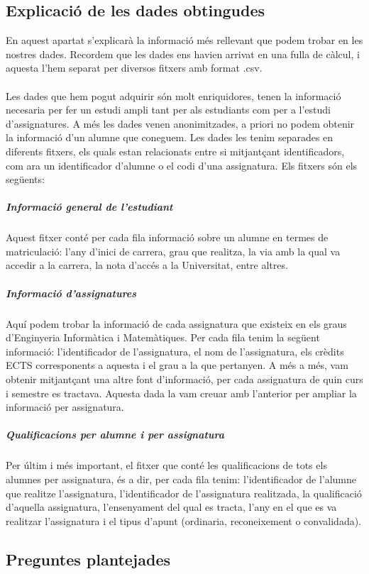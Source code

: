 \documentclass[12pt,a4paper,catalan]{article}
\begin{document}
\subsection{Explicació de les dades obtingudes} 
En aquest apartat s'explicarà la informació més rellevant que podem trobar en les nostres dades. Recordem que les dades ens havien arrivat en una fulla de càlcul, i aquesta l'hem separat per diversos fitxers amb format .csv.
\\
\\
Les dades que hem pogut adquirir són molt enriquidores, tenen la informació necesaria per fer un estudi ampli tant per als estudiants com per a l'estudi d'assignatures. A més les dades venen anonimitzades, a priori no podem obtenir la informació d'un alumne que coneguem. Les dades les tenim separades en diferents fitxers, els quals estan relacionats entre si mitjantçant identificadors, com ara un identificador d'alumne o el codi d'una assignatura. Els fitxers són els següents:

\subparagraph{Informació general de l'estudiant}
Aquest fitxer conté per cada fila informació sobre un alumne en termes de matriculació: l'any d'inici de carrera, grau que realitza, la via amb la qual va accedir a la carrera, la nota d'accés a la Universitat, entre altres.

\subparagraph{Informació d'assignatures}
Aquí podem trobar la informació de cada assignatura que existeix en els graus d'Enginyeria Informàtica i Matemàtiques. Per cada fila tenim la següent informació: l'identificador de l'assignatura, el nom de l'assignatura, els crèdits ECTS corresponents a aquesta i el grau a la que pertanyen. A més a més, vam obtenir mitjantçant una altre font d'informació, per cada assignatura de quin curs i semestre es tractava. Aquesta dada la vam creuar amb l'anterior per ampliar la informació per assignatura.

\subparagraph{Qualificacions per alumne i per assignatura}
Per últim i més important, el fitxer que conté les qualificacions de tots els alumnes per assignatura, és a dir, per cada fila tenim: l'identificador de l'alumne que realitze l'assignatura, l'identificador de l'assignatura realitzada, la qualificació d'aquella assignatura, l'ensenyament del qual es tracta, l'any en el que es va realitzar l'assignatura i el tipus d'apunt (ordinaria, reconeixement o convalidada).

\newpage

\subsection{Preguntes plantejades}
\end{document}
